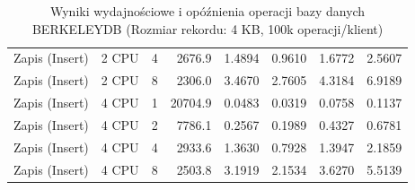 \begin{table}[ht]
{\begin{tabular}{llcrrrrr}
Zapis (Insert) & 2 CPU & 4 & 2676.9 & 1.4894 & 0.9610 & 1.6772 & 2.5607 \\
Zapis (Insert) & 2 CPU & 8 & 2306.0 & 3.4670 & 2.7605 & 4.3184 & 6.9189 \\
Zapis (Insert) & 4 CPU & 1 & 20704.9 & 0.0483 & 0.0319 & 0.0758 & 0.1137 \\
Zapis (Insert) & 4 CPU & 2 & 7786.1 & 0.2567 & 0.1989 & 0.4327 & 0.6781 \\
Zapis (Insert) & 4 CPU & 4 & 2933.6 & 1.3630 & 0.7928 & 1.3947 & 2.1859 \\
Zapis (Insert) & 4 CPU & 8 & 2503.8 & 3.1919 & 2.1534 & 3.6270 & 5.5139 \\
\bottomrule
\end{tabular}%
}
\caption{Wyniki wydajnościowe i opóźnienia operacji bazy danych BERKELEYDB (Rozmiar rekordu: 4 KB, 100k operacji/klient)}
\label{tab:latency_berkeleydb_medium_100000}
\end{table}
